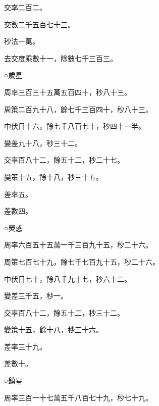 \begin{pinyinscope}
 交率二百二。



 交數二千五百七十三。



 秒法一萬。



 去交度乘數十一，除數七千三百三。



 ○歲星



 周率三百三十五萬五百四十，秒八十三。



 周策二百九十八，餘七千三百四十，秒八十三。



 中伏日十六，餘七千八百七十，秒四十一半。



 變差九十八，秒三十二。



 交率百八十二，餘五十二，秒二十七。



 變策十五，餘十八，秒三十五。



 差率五。



 差數四。



 ○熒惑



 周率六百五十五萬一千三百九十五，秒二十六。



 周策七百七十九，餘七千七百九十五，秒二十六。



 中伏日七十，餘八千九十七，秒六十二。



 變差三千五，秒一。



 交率百八十二，餘五十二，秒三十二。



 變策十五，餘十八，秒三十六。



 差率三十九。



 差數十。



 ○鎮星



 周率三百一十七萬五千八百七十九，秒七十九。




\end{pinyinscope}

